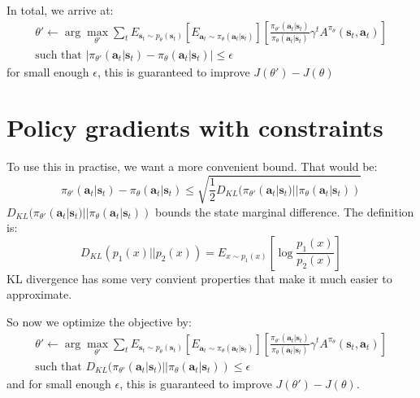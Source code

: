 \documentclass{report}
\newcommand{\argmax}{\arg\!\max}
\begin{document}
In total, we arrive at:
\begin{gather}
		\theta' \leftarrow
		\argmax_{\theta'} \sum_{t}^{} E_{ \bm{s}_{t}\sim p_{ \theta } (\bm{s}_{t}) }
		\left[ E_{ \bm{a}_{t}\sim \pi_{ \theta } (\bm{a}_{t}| \bm{s}_{t} ) } \right]
		\left[ \frac{\pi_{ \theta' }(\bm{a}_{t}| \bm{s}_{t} )}{\pi_{ \theta }(\bm{a}_{t}| \bm{s}_{t} )} 
		\gamma^{ t } A^{ \pi_{ \theta } } (\bm{s}_{t}, \bm{a}_{t} )\right]  \\
		\text{such that } \left| \pi_{ \theta' } (\bm{a}_{t}| \bm{s}_{t} ) - \pi_{ \theta } (\bm{a}_{t}| \bm{s}_{t} ) \right| \leq \epsilon 
\end{gather}
for small enough $ \epsilon  $, this is guaranteed to improve $ J (\theta') - J (\theta)  $

\section{Policy gradients with constraints}
To use this in practise, we want a more convenient bound.
That would be:
\begin{equation}
		\pi_{ \theta' } (\bm{a}_{t}| \bm{s}_{t} ) - \pi_{ \theta } (\bm{a}_{t}| \bm{s}_{t} ) \leq
		\sqrt{\frac{1}{2} D_{ KL } (\pi_{ \theta' }(\bm{a}_{t}| \bm{s}_{t} )||\pi_{ \theta }(\bm{a}_{t}| \bm{s}_{t} ))}
\end{equation}
$  D_{ KL } (\pi_{ \theta' }(\bm{a}_{t}| \bm{s}_{t} )||\pi_{ \theta }(\bm{a}_{t}| \bm{s}_{t} )) $ bounds
the state marginal difference.
The definition is:
\begin{equation}
		D_{ KL } (p_{ 1 }(x) || p_{ 2 } (x)) 
		= E_{ x \sim p_{ 1 }(x) } \left[ \log \frac{p_{ 1 } (x)}{p_{ 2 } ( x)}  \right] 
\end{equation}
KL divergence has some very convient properties that make it much easier to approximate.

So now we optimize the objective by:
\begin{gather}
		\theta' \leftarrow
		\argmax_{\theta'} \sum_{t}^{} E_{ \bm{s}_{t}\sim p_{ \theta } (\bm{s}_{t}) }
		\left[ E_{ \bm{a}_{t}\sim \pi_{ \theta } (\bm{a}_{t}| \bm{s}_{t} ) } \right]
		\left[ \frac{\pi_{ \theta' }(\bm{a}_{t}| \bm{s}_{t} )}{\pi_{ \theta }(\bm{a}_{t}| \bm{s}_{t} )} 
		\gamma^{ t } A^{ \pi_{ \theta } } (\bm{s}_{t}, \bm{a}_{t} )\right]  \\
		\text{such that } 
D_{ KL } (\pi_{ \theta' } (\bm{a}_{t}| \bm{s}_{t} ) || \pi_{ \theta }(\bm{a}_{t}| \bm{s}_{t} ))
		\leq \epsilon 
\end{gather}
and for small enough $ \epsilon  $, this is guaranteed to improve $ J (\theta') - J (\theta)  $.
\end{document}
